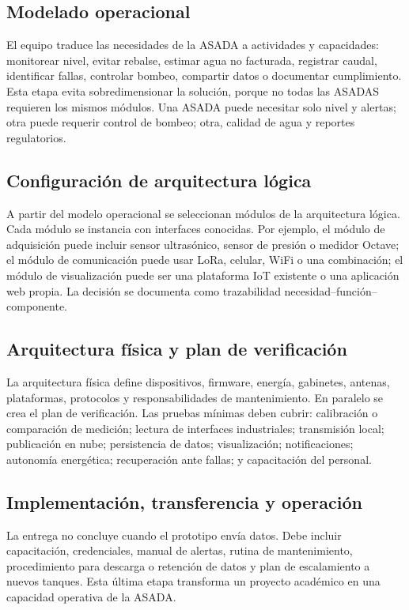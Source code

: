 \documentclass[conference]{IEEEtran}
\begin{document}
\subsection{Modelado operacional}
El equipo traduce las necesidades de la ASADA a actividades y capacidades: monitorear nivel, evitar rebalse, estimar agua no facturada, registrar caudal, identificar fallas, controlar bombeo, compartir datos o documentar cumplimiento. Esta etapa evita sobredimensionar la solución, porque no todas las ASADAS requieren los mismos módulos. Una ASADA puede necesitar solo nivel y alertas; otra puede requerir control de bombeo; otra, calidad de agua y reportes regulatorios.

\subsection{Configuración de arquitectura lógica}
A partir del modelo operacional se seleccionan módulos de la arquitectura lógica. Cada módulo se instancia con interfaces conocidas. Por ejemplo, el módulo de adquisición puede incluir sensor ultrasónico, sensor de presión o medidor Octave; el módulo de comunicación puede usar LoRa, celular, WiFi o una combinación; el módulo de visualización puede ser una plataforma IoT existente o una aplicación web propia. La decisión se documenta como trazabilidad necesidad--función--componente.

\subsection{Arquitectura física y plan de verificación}
La arquitectura física define dispositivos, firmware, energía, gabinetes, antenas, plataformas, protocolos y responsabilidades de mantenimiento. En paralelo se crea el plan de verificación. Las pruebas mínimas deben cubrir: calibración o comparación de medición; lectura de interfaces industriales; transmisión local; publicación en nube; persistencia de datos; visualización; notificaciones; autonomía energética; recuperación ante fallas; y capacitación del personal.

\subsection{Implementación, transferencia y operación}
La entrega no concluye cuando el prototipo envía datos. Debe incluir capacitación, credenciales, manual de alertas, rutina de mantenimiento, procedimiento para descarga o retención de datos y plan de escalamiento a nuevos tanques. Esta última etapa transforma un proyecto académico en una capacidad operativa de la ASADA.
\end{document}
